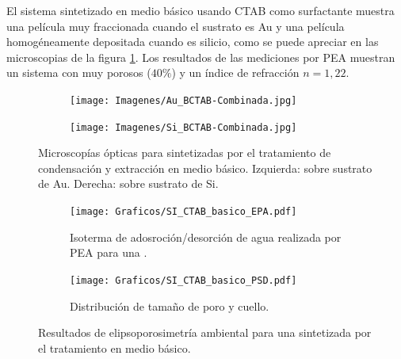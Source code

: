{		El sistema sintetizado en medio básico usando CTAB como surfactante muestra una película muy fraccionada cuando el sustrato es Au y una película homogéneamente depositada cuando es silicio, como se puede apreciar en las microscopias de la figura \ref{fig:Microscopia_CTAB_basico}. Los resultados de las mediciones por PEA muestran un sistema con muy porosos ($40\%$) y un índice de refracción $n=1,22$.
			
		\begin{figure}[!th]
 	   	    \begin{subfigure}[t]{0.49\textwidth}
	       	\texttt{[image: Imagenes/Au\_BCTAB-Combinada.jpg]}
	   		\end{subfigure}
	   		\begin{subfigure}[t]{0.49\textwidth}
	   	    \texttt{[image: Imagenes/Si\_BCTAB-Combinada.jpg]}
	   		\end{subfigure}
			 \caption[Microscopía óptica \pdmC tratamiento en medio básico.]{Microscopías ópticas para \pdmC\space sintetizadas por el tratamiento de condensación y extracción en medio básico. Izquierda: sobre sustrato de Au. Derecha: sobre sustrato de Si.}
			 \label{fig:Microscopia_CTAB_basico}	
		     \end{figure}		

		\begin{figure}[!ht]
		  	\begin{subfigure}[t]{0.495\textwidth}
		  	\texttt{[image: Graficos/SI\_CTAB\_basico\_EPA.pdf]}
			\caption[Elipsoporsimetría \pdmC\space tratamiento básico.]{Isoterma de adosroción/desorción de agua realizada por PEA para una \pdmC.}
			\label{fig:CTAB_basico_EPA}
			\end{subfigure}
			\begin{subfigure}[t]{0.495\textwidth}
		  	\texttt{[image: Graficos/SI\_CTAB\_basico\_PSD.pdf]}
			\caption{Distribución de tamaño de poro y cuello.\\ }
			\label{fig:CTAB_basico_PSD}
			\end{subfigure}
			\caption[Elipsoporosimetría \pdmC\space tratamiento básico.]{Resultados de elipsoporosimetría ambiental para una \pdmC\space sintetizada por el tratamiento en medio básico.}
			\end{figure}

}
